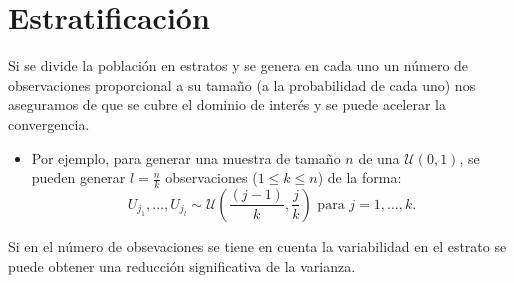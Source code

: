 \documentclass[
  10pt,
]{book}
\providecommand{\tightlist}{%
  \setlength{\itemsep}{0pt}\setlength{\parskip}{0pt}}
\theoremstyle{break}
\theoremstyle{nonumberplain}
\begin{document}
\hypertarget{estratificaciuxf3n}{%
\section{Estratificación}\label{estratificaciuxf3n}}

Si se divide la población en estratos y se genera en cada uno un
número de observaciones proporcional a su tamaño (a la probabilidad de cada uno) nos
aseguramos de que se cubre el dominio de interés y se puede acelerar
la convergencia.

\begin{itemize}
\tightlist
\item
  Por ejemplo, para generar una muestra de tamaño \(n\) de una
  \(\mathcal{U}\left( 0,1\right)\), se pueden generar \(l=\frac{n}{k}\)
  observaciones (\(1\leq k\leq n\)) de la forma:
  \[U_{j_{1}},\ldots,U_{j_{l}}\sim \mathcal{U}\left(  \frac{(j-1)}{k},\frac{j}{k}\right)  \text{ para }j=1,...,k.\]
\end{itemize}

Si en el número de obsevaciones se tiene en cuenta la
variabilidad en el estrato se puede obtener una reducción
significativa de la varianza.
\end{document}
